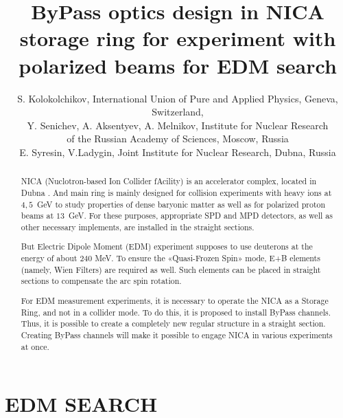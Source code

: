 \documentclass[a4paper,
               keeplastbox,   %
               ]{jacow}
\begin{document}
\title{ByPass optics design in NICA storage ring for experiment with polarized beams for EDM search}

\author{S. Kolokolchikov, International Union of Pure and Applied Physics, Geneva, Switzerland,\\
Y. Senichev, A. Aksentyev, A. Melnikov, Institute for Nuclear Research \\of the Russian Academy of Sciences, Moscow, Russia\\
		E. Syresin, V.Ladygin, Joint Institute for Nuclear Research, Dubna, Russia\\}
	
\maketitle

%
\begin{abstract}

\par NICA (Nuclotron-based Ion Collider fAcility) is an accelerator complex, located in Dubna \cite{NICA}.
And main ring is mainly designed for collision experiments with heavy ions at $4,5$~GeV to study properties of dense baryonic matter as well as for polarized proton beams at $13$~GeV. For these purposes, appropriate SPD and MPD detectors, as well as other
necessary implements, are installed in the straight sections. 

\par But Electric Dipole Moment (EDM) experiment supposes to use deuterons at the energy of about $240$ MeV. 
To ensure the «Quasi-Frozen Spin» mode, E+B elements (namely, Wien Filters) are
required as well. Such elements can be placed in straight sections to compensate the arc spin rotation. 

\par For EDM measurement experiments, it is necessary to operate the NICA as a Storage Ring, and not in a collider
mode. To do this, it is proposed to install ByPass channels. Thus, it is possible to create a completely new
regular structure in a straight section. Creating ByPass channels will make it possible to engage NICA in various
experiments at once.

\end{abstract}

\section{EDM SEARCH}
\end{document}
